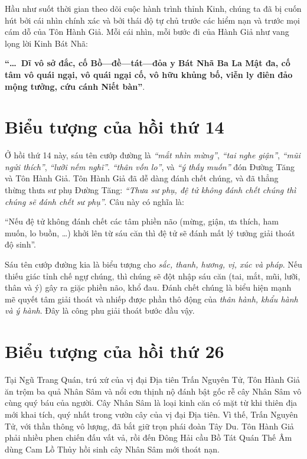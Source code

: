 Hầu như suốt thời gian theo dõi cuộc hành trình thỉnh Kinh, chúng ta đã bị cuốn hút bởi cái nhìn chính xác và bởi thái độ tự chủ trước các hiểm nạn và trước mọi cám dỗ của Tôn Hành Giả. Mỗi cái nhìn, mỗi bước đi của Hành Giả như vang lọng lời Kinh Bát Nhã:

{\bf ``\ldots ~Dĩ vô sở đắc, cố Bồ—đề—tát—đỏa y Bát Nhã Ba La Mật đa, cố tâm vô quái ngại, vô quái ngại cố, vô hữu khủng bố, viễn ly điên đảo mộng tưởng, cứu cánh Niết bàn''}.

\section{Biểu tượng của hồi thứ 14} %
\label{sec:bieu_tuong_cua_hoi_thu_14}

Ở hồi thứ 14 này, sáu tên cướp đường là \emph{``mắt nhìn mừng''}, \emph{``tai nghe giận''}, \emph{``mũi ngửi thích''}, \emph{``lưỡi nếm nghĩ''}. \emph{``thân vốn lo''}, và \emph{``ý thấy muốn''} đón Đường Tăng và Tôn Hành Giả. Tôn Hành Giả đã dễ dàng đánh chết chúng, và đã thẳng thừng thưa sư phụ Đường Tăng: \emph{``Thưa sư phụ, đệ tử không đánh chết chúng thì chúng sẽ đánh chết sư phụ''}. Câu này có nghĩa là:

``Nếu đệ tử không đánh chết các tâm phiền não (mừng, giận, ưa thích, ham muốn, lo buồn, \ldots) khởi lên từ sáu căn thì đệ tử sẽ đánh mất lý tưởng giải thoát độ sinh''.

Sáu tên cướp đường kia là biểu tượng cho \emph{sắc, thanh, hương, vị, xúc và pháp}. Nếu thiếu giác tỉnh chế ngự chúng, thì chúng sẽ đột nhập sáu căn (tai, mắt, mũi, lưỡi, thân và ý) gây ra giặc phiền não, khổ đau. Đánh chết chúng là biểu hiện mạnh mẽ quyết tâm giải thoát và nhiếp được phần thô động của \emph{thân hành, khẩu hành và ý hành}. Đây là công phu giải thoát bước đầu vậy.

\section{Biểu tượng của hồi thứ 26} %
\label{sec:bieu_tuong_cua_hoi_thu_26}

Tại Ngũ Trang Quán, trú xứ của vị đại Địa tiên Trấn Nguyên Tử, Tôn Hành Giả ăn trộm ba quả Nhân Sâm và nổi cơn thịnh nộ đánh bật gốc rễ cây Nhân Sâm vô cùng quý báu của người. Cây Nhân Sâm là loại kinh căn có mặt từ khi thiên địa mới khai tích, quý nhất trong vườn cây của vị đại Địa tiên. Vì thế, Trấn Nguyên Tử, với thần thông vô lượng, đã bắt giữ trọn phái đoàn Tây Du. Tôn Hành Giả phải nhiều phen chiến đấu vất vả, rồi đến Đông Hải cầu Bồ Tát Quán Thế Âm dùng Cam Lồ Thủy hồi sinh cây Nhân Sâm mới thoát nạn.

